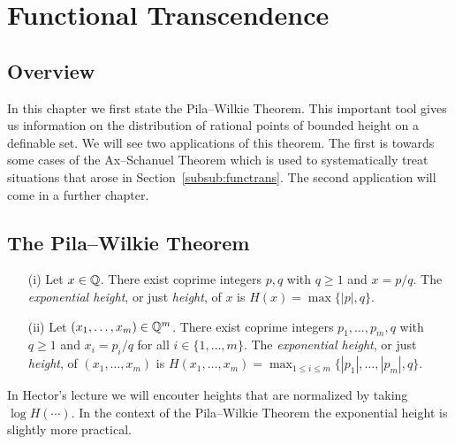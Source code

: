 \chapter{Functional Transcendence}

\section{Overview}

In this chapter we first state the Pila--Wilkie Theorem. This
important tool gives us information on the distribution of rational
points of bounded height on a definable set. We will see two
applications of this theorem. The first is towards some cases of the
Ax--Schanuel Theorem which is used to systematically treat situations
that arose in Section~\ref{subsub:functrans}. The second application
will come in a further chapter. 

\section{The Pila--Wilkie Theorem}


\begin{definition}
  \label{def:height1}
  \begin{enumerate}
  \item [(i)]
  Let $x\in {\mathbb{Q}}$. There exist coprime integers $p,q$ with
  $q\ge 1$ and $x=p/q$. The \emph{exponential height}, or just
  \emph{height},  of $x$ is $H(x)=\max\{|p|,q\}$.
  \item[(ii)] Let $(x_1,\ldots,x_m)\in{\mathbb{Q}}^m$. There exist coprime integers
  $p_1,\ldots,p_m,q$ with $q\ge 1$ and $x_i = p_i/q$ for all $i\in
  \{1,\ldots,m\}$.
  The \emph{exponential height}, or just \emph{height},
  of $(x_1,\ldots,x_m)$ is $H(x_1,\ldots,x_m)
  = \max_{1\le i\le m} \{|p_1|,\ldots,|p_m|,q\}$.
  \end{enumerate}
\end{definition}

In Hector's lecture we will encouter heights that are normalized by
taking $\log H(\cdots)$. In the context of the
Pila--Wilkie Theorem the exponential height is slightly more
practical.


